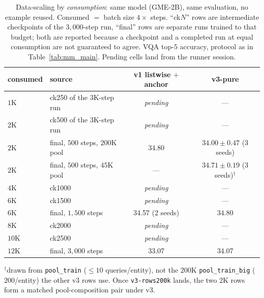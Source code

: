 \begin{table}[t]
\centering\small
\caption{Data-scaling by \emph{consumption}: same model (\textsc{GME-2B}), same evaluation, no
example reused. Consumed $=$ batch size $4 \times$ steps. ``ck$N$'' rows are intermediate
checkpoints of the $3{,}000$-step run, ``final'' rows are separate runs trained to that budget;
both are reported because a checkpoint and a completed run at equal consumption are not
guaranteed to agree. VQA top-$5$ accuracy, protocol as in Table~\ref{tab:mm_main}. Pending cells
land from the runner session.}
\label{tab:mm_consumption}
\begin{tabular}{llcc}
\toprule
consumed & source & v1 listwise $+$ anchor & v3-pure \\
\midrule
$1$K  & ck250 of the $3$K-step run  & \emph{pending} & --- \\
$2$K  & ck500 of the $3$K-step run  & \emph{pending} & --- \\
$2$K  & final, $500$ steps, $200$K pool & 34.80 & $34.00 \pm 0.47$ (3 seeds) \\
$2$K  & final, $500$ steps, $45$K pool  & --- & $\mathbf{34.71 \pm 0.19}$ (3 seeds)$^{\dagger}$ \\
$4$K  & ck1000                      & \emph{pending} & --- \\
$6$K  & ck1500                      & \emph{pending} & --- \\
$6$K  & final, $1{,}500$ steps      & 34.57 (2 seeds) & $34.80$ \\
$8$K  & ck2000                      & \emph{pending} & --- \\
$10$K & ck2500                      & \emph{pending} & --- \\
$12$K & final, $3{,}000$ steps      & 33.07 & 34.07 \\
\bottomrule
\end{tabular}

\vspace{2pt}
{\footnotesize $^{\dagger}$drawn from \texttt{pool\_train} ($\leq 10$ queries/entity), not the
$200$K \texttt{pool\_train\_big} ($200$/entity) the other v3 rows use. Once
\texttt{v3-rows200k} lands, the two $2$K rows form a matched pool-composition pair under v3.}
\end{table}



